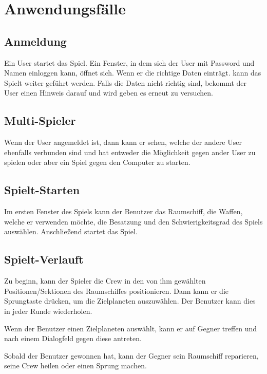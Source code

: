 \documentclass[fontsize=12pt,paper=a4,twoside]{scrartcl}
\begin{document}
\newpage
\section{Anwendungsfälle} \label{sec:Anwendungsfälle}
\subsection{Anmeldung}
Ein User startet das Spiel. Ein Fenster, in dem sich der  User mit Password und Namen einloggen  kann, öffnet sich. Wenn er die richtige Daten einträgt. kann das Spielt  weiter geführt werden. Falls die Daten nicht richtig sind, bekommt der User  einen Hinweis darauf und wird geben es erneut zu versuchen.
\subsection{Multi-Spieler}
Wenn der User angemeldet ist, dann kann er sehen, welche der andere User ebenfalls verbunden sind und hat entweder die Möglichkeit gegen ander User zu spielen oder aber ein Spiel gegen den Computer zu starten.
\subsection{Spielt-Starten}
Im ersten Fenster des Spiels kann der Benutzer das Raumschiff, die Waffen, welche er verwenden möchte, die Besatzung und den Schwierigkeitsgrad des Spiels auswählen. Anschließend startet das Spiel.
\subsection{Spielt-Verlauft}
Zu beginn, kann der Spieler die Crew in den von ihm gewählten Positionen/Sektionen des Raumschiffes positionieren. Dann kann er die Sprungtaste drücken, um die Zielplaneten auszuwählen. Der Benutzer kann dies  in jeder Runde wiederholen.

Wenn der Benutzer einen Zielplaneten auswählt, kann er auf Gegner treffen und nach einem Dialogfeld gegen diese antreten.

Sobald der Benutzer gewonnen hat,  kann der Gegner sein Raumschiff reparieren, seine Crew heilen oder einen Sprung machen.
\end{document}
